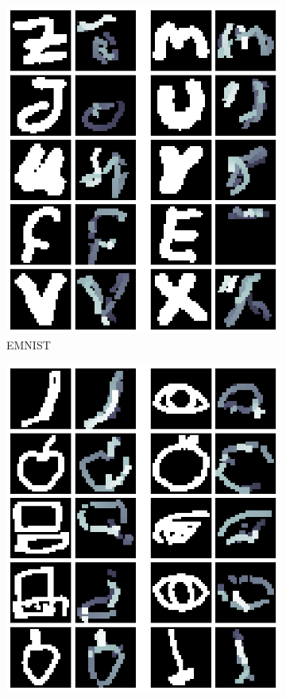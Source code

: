 \begin{figure}[!ht]
\begin{subfigure}[b]{0.3\textwidth}
        \includegraphics[width=\textwidth]{images/resultate/physics-speed-emnist.png}
        \caption{EMNIST}
    \end{subfigure}
    \begin{subfigure}[b]{0.3\textwidth}
        \centering
        \includegraphics[width=\textwidth]{images/resultate/physics-speed-quickdraw.png}

\end{subfigure}
\end{figure}
